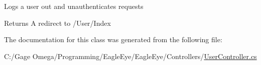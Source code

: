 Logs a user out and unauthenticates requests 

\begin{DoxyReturn}{Returns}
A redirect to /\+User/\+Index
\end{DoxyReturn}


The documentation for this class was generated from the following file\+:\begin{DoxyCompactItemize}
\item 
C\+:/\+Gage Omega/\+Programming/\+Eagle\+Eye/\+Eagle\+Eye/\+Controllers/\mbox{\hyperlink{_user_controller_8cs}{User\+Controller.\+cs}}\end{DoxyCompactItemize}
